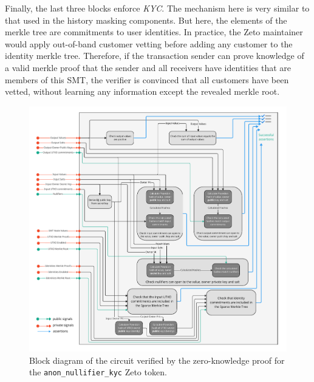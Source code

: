 Finally, the last three blocks enforce \textit{KYC}. The mechanism here is very similar to that used in the history masking components. But here, the elements of the merkle tree are commitments to user identities. In practice, the Zeto maintainer would apply out-of-band customer vetting before adding any customer to the identity merkle tree. Therefore, if the transaction sender can prove knowledge of a valid merkle proof that the sender and all receivers have identities that are members of this SMT, the verifier is convinced that all customers have been vetted, without learning any information except the revealed merkle root.

\begin{figure}
\centering
\includegraphics[width=\linewidth]{anon_nullifier_kyc.pdf}
\caption{Block diagram of the circuit verified by the zero-knowledge proof for the \texttt{anon\_nullifier\_kyc} Zeto token.}\label{fig:zeto_circuit}
\end{figure}

